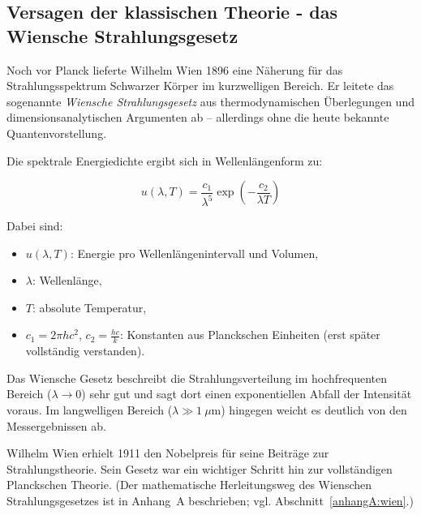 \subsection{Versagen der klassischen Theorie -  das Wiensche Strahlungsgesetz}

Noch vor Planck lieferte Wilhelm Wien 1896 eine Näherung für das Strahlungsspektrum Schwarzer Körper im kurzwelligen Bereich. Er leitete das sogenannte \emph{Wiensche Strahlungsgesetz} aus thermodynamischen Überlegungen und dimensionsanalytischen Argumenten ab – allerdings ohne die heute bekannte Quantenvorstellung.

Die spektrale Energiedichte ergibt sich in Wellenlängenform zu:

\[
u(\lambda, T) = \frac{c_1}{\lambda^5} \exp\left(-\frac{c_2}{\lambda T}\right)
\]

Dabei sind:
\begin{itemize}
	\item \( u(\lambda, T) \): Energie pro Wellenlängenintervall und Volumen,
	\item \( \lambda \): Wellenlänge,
	\item \( T \): absolute Temperatur,
	\item \( c_1 = 2\pi h c^2 \), \( c_2 = \frac{hc}{k} \): Konstanten aus Planckschen Einheiten (erst später vollständig verstanden).
\end{itemize}

Das Wiensche Gesetz beschreibt die Strahlungsverteilung im hochfrequenten Bereich (\( \lambda \to 0 \)) sehr gut und sagt dort einen exponentiellen Abfall der Intensität voraus. Im langwelligen Bereich (\( \lambda \gg 1\ \mu\mathrm{m} \)) hingegen weicht es deutlich von den Messergebnissen ab.

Wilhelm Wien erhielt 1911 den Nobelpreis für seine Beiträge zur Strahlungstheorie. Sein Gesetz war ein wichtiger Schritt hin zur vollständigen Planckschen Theorie.
(Der mathematische Herleitungsweg des Wienschen Strahlungsgesetzes ist in Anhang~A beschrieben; vgl. Abschnitt~\ref{anhangA:wien}.)

